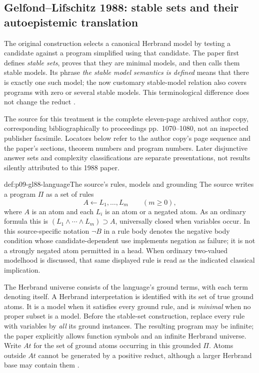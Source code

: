 
\subsection{Gelfond--Lifschitz 1988: stable sets and their autoepistemic translation}
\label{sec:p09-n-c-023-01}

The original construction selects a canonical Herbrand model by testing a
candidate against a program simplified using that candidate.  The paper first
defines \emph{stable sets}, proves that they are minimal models, and then calls
them stable models.  Its phrase \emph{the stable model semantics is defined}
means that there is exactly one such model; the now customary stable-model
relation also covers programs with zero or several stable models.  This
terminological difference does not change the reduct
\cite[\S\S1--2, author-copy pp.~1--5]{GelfondLifschitz1988}.

The source for this treatment is the complete eleven-page archived author
copy, corresponding bibliographically to proceedings pp.~1070--1080, not an
inspected publisher facsimile.  Locators below refer to the author copy's page
sequence and the paper's sections, theorem numbers and program numbers.
Later disjunctive answer sets and complexity classifications are separate
presentations, not results silently attributed to this 1988 paper.

\begin{hbdefinition}{def:p09-gl88-language}{The source's rules, models and grounding}
The source writes a program \(\Pi\) as a set of rules
\[
 A\leftarrow L_1,\ldots,L_m\qquad(m\geq0),
\]
where \(A\) is an atom and each \(L_i\) is an atom or a negated atom.
As an ordinary formula this is
\((L_1\land\cdots\land L_m)\supset A\), universally closed when variables
occur.  In this source-specific notation \(\neg B\) in a rule body denotes
the negative body condition whose candidate-dependent use implements
negation as failure; it is not a strongly negated atom permitted in a head.
When ordinary two-valued modelhood is discussed, that same displayed rule is
read as the indicated classical implication.

The Herbrand universe consists of the language's ground terms, with each term
denoting itself.  A Herbrand interpretation is identified with its set of true
ground atoms.  It is a model when it satisfies every ground rule, and is
\emph{minimal} when no proper subset is a model.  Before the stable-set
construction, replace every rule with variables by \emph{all} its ground
instances.  The resulting program may be infinite; the paper explicitly
allows function symbols and an infinite Herbrand universe.  Write \(At\) for
the set of ground atoms occurring in this grounded \(\Pi\).  Atoms outside
\(At\) cannot be generated by a positive reduct, although a larger Herbrand
base may contain them \cite[\S\S1--2, pp.~1--4]{GelfondLifschitz1988}.
\end{hbdefinition}

